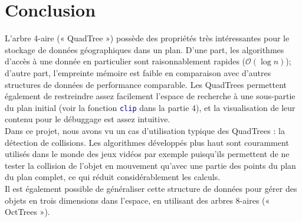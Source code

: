 \documentclass[11pt]{scrartcl}
\newcommand{\funname}[1]{\texttt{\textcolor{darkblue}{#1}}}
\begin{document}
\section*{Conclusion}
L'arbre 4-aire (« QuadTree ») possède des propriétés très intéressantes pour le stockage de données géographiques dans un plan. D'une part, les algorithmes d'accès à une donnée en particulier sont raisonnablement rapides ($\mathcal{O}(\log{}n)$); d'autre part, l'empreinte mémoire est faible en comparaison avec d'autres structures de données de performance comparable. Les QuadTrees permettent également de restreindre assez facilement l'espace de recherche à une sous-partie du plan initial (voir la fonction \funname{clip} dans la partie 4), et la visualisation de leur contenu pour le débuggage est assez intuitive.
\\
Dans ce projet, nous avons vu un cas d'utilisation typique des QuadTrees : la détection de collisions. Les algorithmes développés plus haut sont couramment utilisés dans le monde des jeux vidéos par exemple puisqu'ils permettent de ne tester la collision de l'objet en mouvement qu'avec une partie des points du plan du plan complet, ce qui réduit considérablement les calculs.
\\
Il est également possible de généraliser cette structure de données pour gérer des objets en trois dimensions dans l'espace, en utilisant des arbres 8-aires (« OctTrees »).
\end{document}
